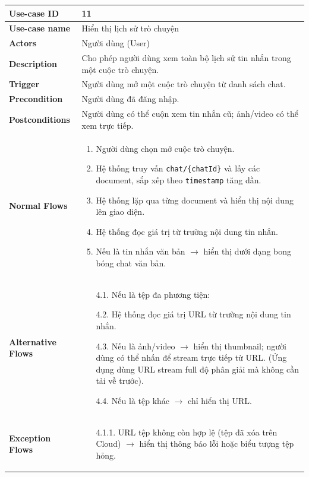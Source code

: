 \documentclass[a4paper, 12pt]{article}
\begin{document}
	\begin{longtable}{|p{3.5cm}|p{12cm}|}
		\hline
		\textbf{Use-case ID} & 11 \\
		\hline
		\textbf{Use-case name} & Hiển thị lịch sử trò chuyện \\
		\hline
		\textbf{Actors} & Người dùng (User) \\
		\hline
		\textbf{Description} & Cho phép người dùng xem toàn bộ lịch sử tin nhắn trong một cuộc trò chuyện. \\
		\hline
		\textbf{Trigger} & Người dùng mở một cuộc trò chuyện từ danh sách chat. \\
		\hline
		\textbf{Precondition} & Người dùng đã đăng nhập. \\
		\hline
		\textbf{Postconditions} & Người dùng có thể cuộn xem tin nhắn cũ; ảnh/video có thể xem trực tiếp. \\
		\hline
		\textbf{Normal Flows} & 
		\begin{enumerate}[leftmargin=1.5em]
			\item Người dùng chọn mở cuộc trò chuyện.
			\item Hệ thống truy vấn \texttt{chat/\{chatId\}} và lấy các document, sắp xếp theo \texttt{timestamp} tăng dần.
			\item Hệ thống lặp qua từng document và hiển thị nội dung lên giao diện.
			\item Hệ thống đọc giá trị từ trường nội dung tin nhắn.
			\item Nếu là tin nhắn văn bản $\rightarrow$ hiển thị dưới dạng bong bóng chat văn bản.
		\end{enumerate} \\
		\hline
		\textbf{Alternative Flows} & 
		\begin{itemize}[leftmargin=2.5em, labelsep=0.5em]
			\item[4.1.] Nếu là tệp đa phương tiện:
			\item[4.2.] Hệ thống đọc giá trị URL từ trường nội dung tin nhắn.
			\item[4.3.] Nếu là ảnh/video $\rightarrow$ hiển thị thumbnail; người dùng có thể nhấn để stream trực tiếp từ URL. (Ứng dụng dùng URL stream full độ phân giải mà không cần tải về trước).
			\item[4.4.] Nếu là tệp khác $\rightarrow$ chỉ hiển thị URL.
		\end{itemize} \\
		\hline
		\textbf{Exception Flows} & 
		\begin{itemize}[leftmargin=3.5em, labelsep=0.5em]
			\item[4.1.1.] URL tệp không còn hợp lệ (tệp đã xóa trên Cloud) $\rightarrow$ hiển thị thông báo lỗi hoặc biểu tượng tệp hỏng.
		\end{itemize} \\
		\hline
	\end{longtable}
	\vspace{0.5cm}
	
\end{document}
